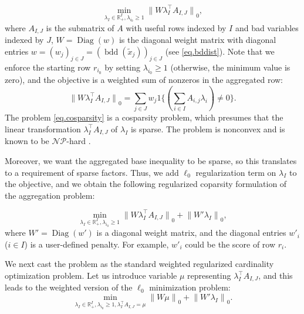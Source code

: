 \documentclass[a4paper,UKenglish,cleveref, autoref,  thm-restate]{lipics-v2021}
\newcommand{\bR}{\mathbb{R}}
\newcommand{\norm}[1]{{\lVert#1\rVert}}
\newcommand{\relx}[1]{\tilde{#1}}
\DeclareMathOperator{\Diag}{Diag}
\DeclareMathOperator{\bd}{bdd}
\begin{document}
	
	\begin{equation}
		\label{eq.cosparsity}
		\min_{\lambda_I \in \bR^I_+, \lambda_{i_0} \ge 1}  \norm{ W \lambda_I^\top A_{I,J}}_0,
	\end{equation}
	where $A_{I,J}$ is the submatrix of $A$ with useful rows indexed by $I$ and bad variables indexed by $J$, $W = \Diag(w)$ is the diagonal weight matrix with diagonal entries  $w = (w_j)_{j \in J}= (\bd(\relx{x}_j))_{j \in J}$ (see \eqref{eq.bddist}). Note that we enforce the starting row $r_{i_0}$ by setting $\lambda_{i_0} \ge 1$ (otherwise, the minimum value is zero), and the objective is a weighted sum of nonzeros in the aggregated row: %
	\begin{equation}
		\norm{ W \lambda_I^\top A_{I,J}}_0 =  \sum_{j \in J}w_j 1\{(\sum_{i \in I} A_{i,j} \lambda_i) \ne  0\}.
	\end{equation}
	The problem \eqref{eq.cosparsity} is a cosparsity problem, which presumes that the linear transformation $\lambda_I^\top A_{I,J} $ of $\lambda_I$ is sparse. The problem is nonconvex and is known to be $\mathcal{NP}$-hard \cite{tillmann2024cardinality}.
	
	
	
	
	Moreover, we want the aggregated base inequality to be sparse, so this translates to a requirement of sparse factors. Thus, we add $\ell_0$ regularization term on $\lambda_I$ to the objective, and we obtain the following regularized coparsity formulation of the aggregation problem:
	
	
	\begin{equation}
		\label{card.l0}
		\min_{\lambda_I \in \bR^I_+, \lambda_{i_0} \ge 1}  \norm{ W \lambda_I^\top A_{I,J}}_0 +  \norm{ W'  \lambda_I}_0,
	\end{equation}
	where  $W' = \Diag(w')$ is a diagonal weight matrix, and the diagonal entries  $w'_i$ ($i \in I$) is  a user-defined penalty.  For example, $w'_i$ could be the score of row $r_i$.
	
	
	We next cast the problem as the standard weighted regularized cardinality optimization problem. Let us introduce variable $\mu$ representing $\lambda_I^\top A_{I,J}$, and this leads to the weighted version of the $\ell_0$ minimization problem:
	\begin{equation}
		\label{l0}
		\min_{\lambda_I \in \bR^I_+, \lambda_{i_0} \ge 1, \lambda_I^\top A_{I,J} = \mu }  \norm{ W \mu}_0 +  \norm{ W'  \lambda_I}_0.
	\end{equation}
	
\end{document}
